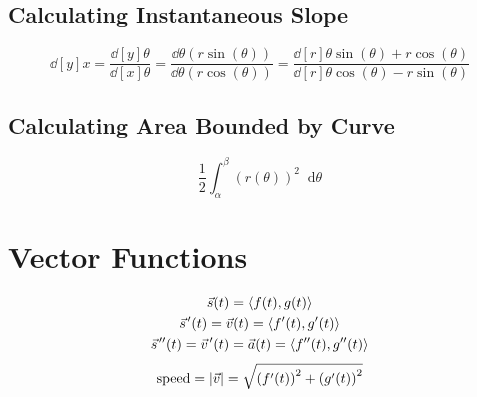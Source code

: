 \documentclass[12pt]{article}
\DeclarePairedDelimiter\abs{\lvert}{\rvert}
\newcommand*{\D}[1]{\mathop{}\!\mathrm{d}#1}
\newcommand{\pvec}[1]{\vec{#1}\mkern2mu\vphantom{#1}}
\newcommand*{\fixmath}{%
  \makebox{}\vspace{\glueexpr-\baselineskip-\abovedisplayskip}}
\newenvironment{fixaskip}{\setlength{\abovedisplayskip}{0pt}\fixmath%
  \ignorespaces}{\ignorespacesafterend}
\newenvironment{fixskip}{\setlength{\abovedisplayskip}{0pt}%
  \setlength{\belowdisplayskip}{0pt}\fixmath\ignorespaces}%
  {\ignorespacesafterend}
\begin{document}
\subsection*{Calculating Instantaneous Slope}
\begin{fixskip}
  \[
    \dd[y]{x} = \frac{\dd[y]{\theta}}{\dd[x]{\theta}}
    = \frac{\dd{\theta}(r\sin(\theta))}{\dd{\theta}(r\cos(\theta))}
    = \frac{\dd[r]{\theta}\sin(\theta) + r\cos(\theta)}%
      {\dd[r]{\theta}\cos(\theta) - r\sin(\theta)}
  \]
\end{fixskip}
\subsection*{Calculating Area Bounded by Curve}
\begin{fixskip}
  \[
    \frac{1}{2} \int_\alpha^\beta {(r(\theta))}^2 \D{\theta}
  \]
\end{fixskip}
\section*{Vector Functions}
\begin{fixaskip}
  \begin{gather*}
    \vec{s}(t) = \left<f(t),g(t)\right>\\
    \pvec{s}'(t) = \vec{v}(t) = \left<f'(t),g'(t)\right>\\
    \pvec{s}''(t) = \pvec{v}'(t) = \vec{a}(t) = \left<f''(t),g''(t)\right>
  \end{gather*}
\end{fixaskip}
\[
  \text{speed} = \abs{\vec{v}} = \sqrt{{(f'(t))}^2 + {(g'(t))}^2}
\]
\end{document}
